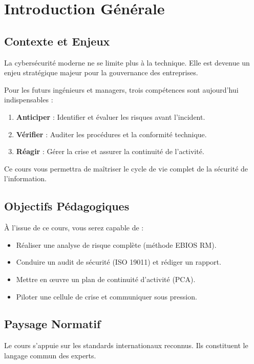 \chapter{Introduction Générale}
\label{chap:intro}

\section{Contexte et Enjeux}

La cybersécurité moderne ne se limite plus à la technique. Elle est devenue un enjeu stratégique majeur pour la gouvernance des entreprises.

Pour les futurs ingénieurs et managers, trois compétences sont aujourd'hui indispensables :
\begin{enumerate}
    \item \textbf{Anticiper} : Identifier et évaluer les risques avant l'incident.
    \item \textbf{Vérifier} : Auditer les procédures et la conformité technique.
    \item \textbf{Réagir} : Gérer la crise et assurer la continuité de l'activité.
\end{enumerate}

Ce cours vous permettra de maîtriser le cycle de vie complet de la sécurité de l'information.

\section{Objectifs Pédagogiques}

À l'issue de ce cours, vous serez capable de :
\begin{itemize}
    \item Réaliser une analyse de risque complète (méthode EBIOS RM).
    \item Conduire un audit de sécurité (ISO 19011) et rédiger un rapport.
    \item Mettre en œuvre un plan de continuité d'activité (PCA).
    \item Piloter une cellule de crise et communiquer sous pression.
\end{itemize}

\section{Paysage Normatif}

Le cours s'appuie sur les standards internationaux reconnus. Ils constituent le langage commun des experts.

